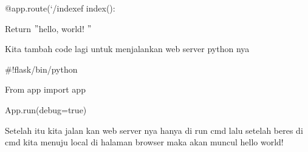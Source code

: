 \noindent 
{\fontsize{14pt}{14pt}\selectfont @app.route(‘/indexef index(): \\} \par
\vspace{14pt}
\noindent 
{\fontsize{14pt}{14pt}\selectfont Return  $ " $hello, world! $ " $ \\} \par
\vspace{14pt}
\noindent 
{\fontsize{14pt}{14pt}\selectfont Kita tambah code lagi untuk menjalankan web server python nya \\} \par
\vspace{14pt}
\vspace{14pt}
\noindent 
{\fontsize{14pt}{14pt}\selectfont  $  \#  $!flask/bin/python \\} \par
\noindent 
{\fontsize{14pt}{14pt}\selectfont From app import app \\} \par
\noindent 
{\fontsize{14pt}{14pt}\selectfont App.run(debug=true) \\} \par
\vspace{14pt}
\noindent 
{\fontsize{14pt}{14pt}\selectfont Setelah itu kita jalan kan web server nya hanya di run cmd lalu setelah beres di cmd kita menuju local di halaman browser maka akan muncul hello world! \\} \par
\vspace{14pt}
\vspace{14pt}
